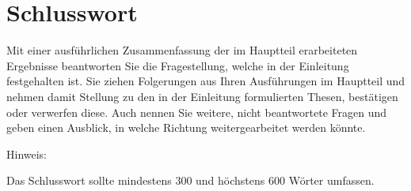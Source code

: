 \part{Schlusswort}
Mit einer ausführlichen Zusammenfassung der im Hauptteil erarbeiteten Ergebnisse beantworten Sie die Fragestellung, welche in der Einleitung festgehalten ist. Sie ziehen Folgerungen aus Ihren Ausführungen im Hauptteil und nehmen damit Stellung zu den in der Einleitung formulierten Thesen, bestätigen oder verwerfen diese. Auch nennen Sie weitere, nicht beantwortete Fragen und geben einen Ausblick, in welche Richtung weitergearbeitet werden könnte. 

Hinweis:

Das Schlusswort sollte mindestens 300 und höchstens 600 Wörter umfassen.

